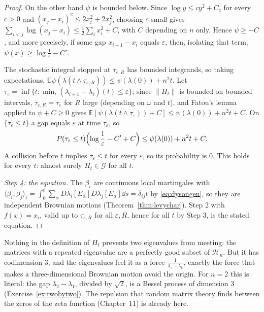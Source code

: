 \begin{proof}
On the other hand $\psi$ is bounded below. Since $\log y\le cy^2+C_c$ for every $c>0$ and $(x_j-x_i)^2\le2x_i^2+2x_j^2$, choosing $c$ small gives $\sum_{i<j}\log(x_j-x_i)\le\frac12\sum_ix_i^2+C$, with $C$ depending on $n$ only.
Hence $\psi\ge-C$, and more precisely, if some gap $x_{i+1}-x_i$ equals $\varepsilon$, then, isolating that term, $\psi(x)\ge\log\frac1\varepsilon-C'$.

The stochastic integral stopped at $\tau_{\varepsilon,R}$ has bounded integrands, so taking expectations,
$\mathbb E\psi(\lambda(t\wedge\tau_{\varepsilon,R}))\le\psi(\lambda(0))+n^2t$. Let $\tau_\varepsilon=\inf\{t:\min_i(\lambda_{i+1}-\lambda_i)(t)\le\varepsilon\}$; since $\|H_t\|$ is bounded on bounded intervals, $\tau_{\varepsilon,R}=\tau_\varepsilon$ for $R$
large (depending on $\omega$ and $t$), and Fatou's lemma applied to $\psi+C\ge0$ gives $\mathbb E[\psi(\lambda(t\wedge\tau_\varepsilon))+C]\le\psi(\lambda(0))+n^2t+C$. On $\{\tau_\varepsilon\le t\}$ a gap equals $\varepsilon$ at time $\tau_\varepsilon$, so
\[
P(\tau_\varepsilon\le t)\Bigl(\log\frac1\varepsilon-C'+C\Bigr)\le\psi(\lambda(0))+n^2t+C.
\]
A collision before $t$ implies $\tau_\varepsilon\le t$ for every $\varepsilon$, so its probability is $0$. This holds for every $t$: almost surely $H_t\in\mathcal G$ for all $t$.

\emph{Step 4: the equation.} The $\beta_i$ are continuous local martingales with $\langle\beta_i,\beta_j\rangle_t=\int_0^t\sum_\alpha D\lambda_i[E_\alpha]D\lambda_j[E_\alpha]\dd s=\delta_{ij}t$ by \eqref{eq:dysongen}, so they are independent
Brownian motions (Theorem~\ref{thm:levychar}). Step 2 with $f(x)=x_i$, valid up to $\tau_{\varepsilon,R}$ for all $\varepsilon,R$, hence for all $t$ by Step 3, is the stated equation.
\end{proof}

\begin{beauty}
Nothing in the definition of $H_t$ prevents two eigenvalues from meeting: the matrices with a repeated eigenvalue are a perfectly good subset of $\mathcal H_n$. But it has codimension $3$, and the
eigenvalues feel it as a force $\frac1{\lambda_i-\lambda_k}$, exactly the force that makes a three-dimensional Brownian motion avoid the origin. For $n=2$ this is literal: the gap
$\lambda_2-\lambda_1$, divided by $\sqrt2$, is a Bessel process of dimension $3$ (Exercise~\ref{ex:twobytwo}). The repulsion that random matrix theory finds between the zeros of the zeta function
(Chapter~11) is already here.
\end{beauty}

